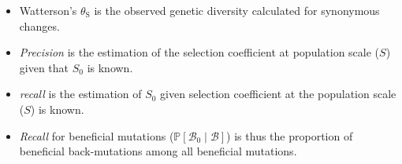 \documentclass[12pt]{article}
\newcommand{\proba}{\mathbb{P}}
\newcommand{\Sphy}{S_{0}}
\newcommand{\SphyBen}{\mathcal{B}_0}
\newcommand{\given}{\mid}
\newcommand{\Spop}{S}
\newcommand{\SpopBen}{\mathcal{B}}
\newcommand{\thetaSyn}{\theta_{\text{S}}}
\begin{document}
    \begin{itemize}
        \item Watterson's $\thetaSyn$ is the observed genetic diversity calculated for synonymous changes.
        \item \textit{Precision} is the estimation of the selection coefficient at population scale ($\Spop$) given that $\Sphy$ is known.
        \item  \textit{recall} is the estimation of $\Sphy$ given selection coefficient at the population scale ($\Spop$) is known.
        \item \textit{Recall} for beneficial mutations ($\proba [\SphyBen \given \SpopBen]$) is thus the proportion of beneficial back-mutations among all beneficial mutations.
    \end{itemize}

    
    
\end{document}
